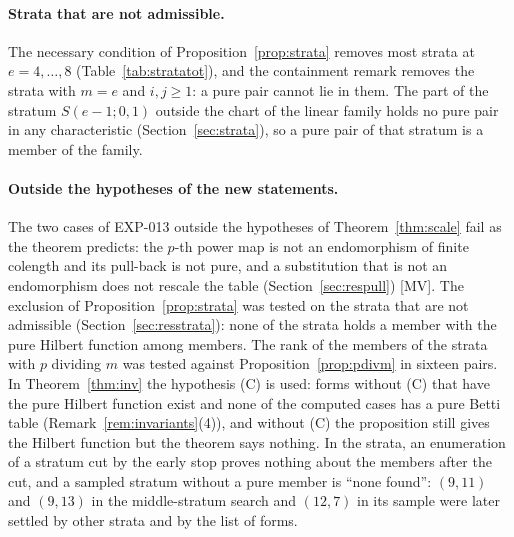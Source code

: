 \documentclass[11pt]{article}
\theoremstyle{definition}
\theoremstyle{remark}
\newcommand{\EXP}[1]{\mbox{EXP-#1}}
\newcommand{\F}{\mathbb{F}}
\begin{document}
\begin{table}[htbp]
\centering\footnotesize

\caption{The five pairs outside the hypotheses of Theorem~\ref{thm:central}: the case, $(e,p)$, the forms over $\F_p$, what places the pair outside the hypotheses, whether $gf-fg$ is a multiple of $z^e$ (computed by the script) and whether the module has finite length within degree $5e$ (it does not in any case).}
\label{tab:centralneg}
\end{table}

\begin{table}[htbp]
\centering\footnotesize

\caption{The three pairs of the class $V_e$ built to violate the criterion of Theorem~\ref{thm:crit}: the case, $(e,p)$, the forms over $\F_p$, how the pair violates the criterion, and the outcome: none has finite length within degree $5e$; the script recomputes $gf-fg=-Dz$ for each.}
\label{tab:critneg}
\end{table}

\paragraph{Strata that are not admissible.} The necessary condition of Proposition~\ref{prop:strata} removes most strata at $e=4,\dots,8$ (Table~\ref{tab:stratatot}), and the containment remark removes the strata with $m=e$ and $i,j\ge1$: a pure pair cannot lie in them. The part of the stratum $S(e-1;0,1)$ outside the chart of the linear family holds no pure pair in any characteristic (Section~\ref{sec:strata}), so a pure pair of that stratum is a member of the family.

\paragraph{Outside the hypotheses of the new statements.} The two cases of \EXP{013} outside the hypotheses of Theorem~\ref{thm:scale} fail as the theorem predicts: the $p$-th power map is not an endomorphism of finite colength and its pull-back is not pure, and a substitution that is not an endomorphism does not rescale the table (Section~\ref{sec:respull}) [MV]. The exclusion of Proposition~\ref{prop:strata} was tested on the strata that are not admissible (Section~\ref{sec:resstrata}): none of the \nwcNonAdm{} strata holds a member with the pure Hilbert function among \nwcNonAdmMembers{} members. The rank of the members of the strata with $p$ dividing $m$ was tested against Proposition~\ref{prop:pdivm} in sixteen pairs. In Theorem~\ref{thm:inv} the hypothesis (C) is used: forms without (C) that have the pure Hilbert function exist and none of the computed cases has a pure Betti table (Remark~\ref{rem:invariants}(4)), and without (C) the proposition still gives the Hilbert function but the theorem says nothing. In the strata, an enumeration of a stratum cut by the early stop proves nothing about the members after the cut, and a sampled stratum without a pure member is ``none found'': $(9,11)$ and $(9,13)$ in the middle-stratum search and $(12,7)$ in its sample were later settled by other strata and by the list of forms.
\end{document}
